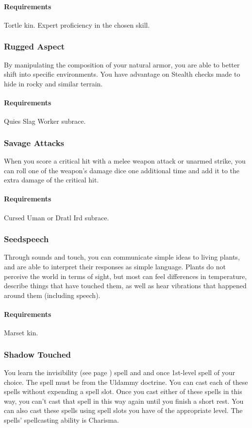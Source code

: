     \paragraph{Requirements} Tortle kin. Expert proficiency in the chosen skill.
\subsubsection{Rugged Aspect} \label{feat::ruggedaspect}
    By manipulating the composition of your natural armor, you are able to better shift into specific environments.
    You have advantage on Stealth checks made to hide in rocky and similar terrain.
    \paragraph{Requirements} Quies Slag Worker subrace.
\subsubsection{Savage Attacks} \label{feat::savageattacks}
    When you score a critical hit with a melee weapon attack or unarmed strike, you can roll one of the weapon's damage dice one additional time and add it to the extra damage of the critical hit.
    \paragraph{Requirements} Cursed Uman or Dratl Ird subrace.
\subsubsection{Seedspeech} \label{feat::seedspeech}
    Through sounds and touch, you can communicate simple ideas to living plants, and are able to interpret their responses as simple language.
    Plants do not perceive the world in terms of sight, but most can feel differences in temperature, describe things that have touched them, as well as hear vibrations that happened around them (including speech).
    \paragraph{Requirements} Marset kin.
\subsubsection{Shadow Touched} \label{feat::shadowtouched}
    You learn the invisibility (see page \pageref{spell::invisibility}) spell and and once 1st-level spell of your choice.
    The spell must be from the Uldammy doctrine.
    You can cast each of these spells without expending a spell slot.
    Once you cast either of these spells in this way, you can't cast that spell in this way again until you finish a short rest.
    You can also cast these spells using spell slots you have of the appropriate level.
    The spells' spellcasting ability is Charisma.
